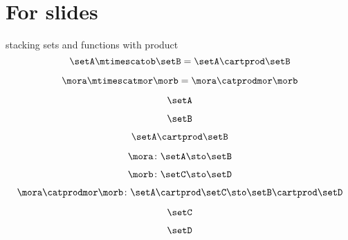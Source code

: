 
\section[For slides]{For slides}

\begin{forslides}

    stacking sets and functions with product
    \begin{equation}
        \label{eq:parallelism-000}
        \setA \mtimescatob \setB = \setA \cartprod \setB
    \end{equation}

    \begin{equation}
        \label{eq:parallelism-001}
        \mora \mtimescatmor \morb = \mora \catprodmor \morb
    \end{equation}

    \begin{equation}
        \label{eq:parallelism-002}
        \setA
    \end{equation}

    \begin{equation}
        \label{eq:parallelism-003}
        \setB
    \end{equation}

    \begin{equation}
        \label{eq:parallelism-004}
        \setA \cartprod \setB
    \end{equation}

    \begin{equation}
        \label{eq:parallelism-005}
        \mora \colon \setA \sto \setB
    \end{equation}

    \begin{equation}
        \label{eq:parallelism-006}
        \morb \colon \setC \sto \setD
    \end{equation}

    \begin{equation}
        \label{eq:parallelism-007}
        \mora \catprodmor \morb \colon \setA \cartprod \setC \sto \setB \cartprod \setD
    \end{equation}

    \begin{equation}
        \label{eq:parallelism-008}
        \setC
    \end{equation}

    \begin{equation}
        \label{eq:parallelism-009}
        \setD
    \end{equation}


\end{forslides}
